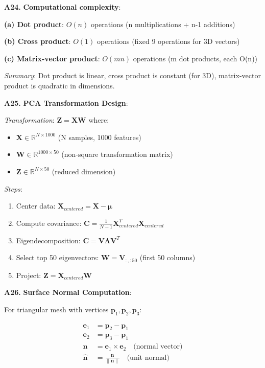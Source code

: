 \documentclass[12pt,a4paper]{article}
\theoremstyle{definition}
\begin{document}
\textbf{A24.} \textbf{Computational complexity}:

\textbf{(a) Dot product}: $O(n)$ operations (n multiplications + n-1 additions)

\textbf{(b) Cross product}: $O(1)$ operations (fixed 9 operations for 3D vectors)

\textbf{(c) Matrix-vector product}: $O(mn)$ operations (m dot products, each O(n))

\textit{Summary}: Dot product is linear, cross product is constant (for 3D), matrix-vector product is quadratic in dimensions.

\textbf{A25.} \textbf{PCA Transformation Design}:

\textit{Transformation}: $\mathbf{Z} = \mathbf{X}\mathbf{W}$ where:
\begin{itemize}
\item $\mathbf{X} \in \mathbb{R}^{N \times 1000}$ (N samples, 1000 features)
\item $\mathbf{W} \in \mathbb{R}^{1000 \times 50}$ (non-square transformation matrix)
\item $\mathbf{Z} \in \mathbb{R}^{N \times 50}$ (reduced dimension)
\end{itemize}

\textit{Steps}:
\begin{enumerate}
\item Center data: $\mathbf{X}_{centered} = \mathbf{X} - \boldsymbol{\mu}$
\item Compute covariance: $\mathbf{C} = \frac{1}{N-1}\mathbf{X}_{centered}^T\mathbf{X}_{centered}$
\item Eigendecomposition: $\mathbf{C} = \mathbf{V}\boldsymbol{\Lambda}\mathbf{V}^T$
\item Select top 50 eigenvectors: $\mathbf{W} = \mathbf{V}_{:,:50}$ (first 50 columns)
\item Project: $\mathbf{Z} = \mathbf{X}_{centered}\mathbf{W}$
\end{enumerate}

\textbf{A26.} \textbf{Surface Normal Computation}:

For triangular mesh with vertices $\mathbf{p}_1, \mathbf{p}_2, \mathbf{p}_3$:

\begin{align}
\mathbf{e}_1 &= \mathbf{p}_2 - \mathbf{p}_1 \\
\mathbf{e}_2 &= \mathbf{p}_3 - \mathbf{p}_1 \\
\mathbf{n} &= \mathbf{e}_1 \times \mathbf{e}_2 \quad \text{(normal vector)} \\
\hat{\mathbf{n}} &= \frac{\mathbf{n}}{\|\mathbf{n}\|} \quad \text{(unit normal)}
\end{align}
\end{document}
